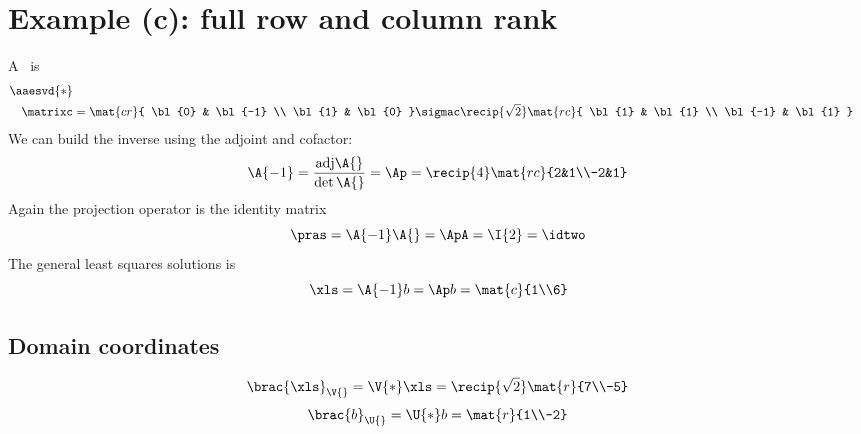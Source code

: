 \section{Example (c): full row and column rank}  %
A \asvd\ is \ 
  \begin{equation}
    \begin{split}
      \aaesvd{*} \\
      \matrixc & = 
      \mat{cr}{
      \bl{0} & \bl{-1} \\
      \bl{1} & \bl{0}
      }
      \sigmac
      \recip{\sqrt{2}}\mat{rc}{
      \bl{1}  & \bl{1} \\
      \bl{-1} & \bl{1}
      }
    \end{split}
  \end{equation}
We can build the inverse using the adjoint and cofactor:
  \begin{equation}
      \A{-1} = \frac{\text{adj} \A{}}{\det \A{}} = \Ap = \recip{4} \mat{rc}{2&1\\-2&1}
  \end{equation}
Again the projection operator is the identity matrix
  \begin{equation}
      \pras =\A{-1}\A{} = \ApA = \I{2} = \idtwo
  \end{equation}
The general least squares solutions is
  \begin{equation}
      \xls = \A{-1}b = \Ap b = \mat{c}{1\\6}
  \end{equation}

\subsection{Domain coordinates}
  \begin{equation}
    \brac{\xls}_{\V{}} = \V{*}\xls = \recip{\sqrt{2}} \mat{r}{7\\-5}
  \end{equation}
  \begin{equation}
    \brac{b}_{\U{}} = \U{*}b = \mat{r}{1\\-2}
  \end{equation}
\endinput  %

